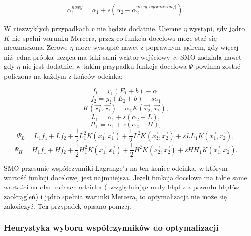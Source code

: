 \documentclass[[10pt,a4paper]{article}
\begin{document}
\begin{equation}
\alpha_1^{nowy} = \alpha_1 + s(\alpha_2 - \alpha_2^{nowy, ograniczony)}).
\end{equation}

W niezwykłych przypadkach $\eta$ nie będzie dodatnie. Ujemne $\eta$ wystąpi, gdy jądro $K$ nie spełni warunku Mercera, przez co funkcja docelowa może stać się nieoznaczona. Zerowe $\eta$ może wystąpić nawet z poprawnym jądrem, gdy więcej niż jedna próbka ucząca ma taki sami wektor wejściowy $x$. SMO zadziała nawet gdy $\eta$ nie jest dodatnie, w takim przypadku funkcja docelowa $\Psi$ powinna zostać policzona na każdym z końców odcinka:


\begin{equation}
f_1 = y_1(E_1+b) - \alpha_1 
\end{equation}
\begin{equation}
f_2 = y_2(E_2+b) - s\alpha_1
\end{equation}
\begin{equation}
K(\overrightarrow{x_1}, \overrightarrow{x_2}) - \alpha_2 K(\overrightarrow{x_2},\overrightarrow{x_2}),
\end{equation}
\begin{equation}
L_1 = \alpha_1 + s(\alpha_2 - L),
\end{equation}
\begin{equation}
H_1 = \alpha_1 + s(\alpha_2 - H),
\end{equation}
\begin{equation}
\Psi_L = L_1 f_1 + Lf_2 + \frac{1}{2}L_1^2 K(\overrightarrow{x_1},\overrightarrow{x_1}) + \frac{1}{2}L^2 K(\overrightarrow{x_2},\overrightarrow{x_2}) + sLL_1 K(\overrightarrow{x_1},\overrightarrow{x_2}), 
\end{equation}
\begin{equation}
\Psi_H = H_1 f_1 + Hf_2 + \frac{1}{2}H_1^2 K(\overrightarrow{x_1},\overrightarrow{x_1}) + \frac{1}{2}H^2 K(\overrightarrow{x_2},\overrightarrow{x_2}) + sHH_1 K(\overrightarrow{x_1},\overrightarrow{x_2}).
\end{equation}


SMO przesunie współczynniki Lagrange'a na ten koniec odcinka, w którym wartość funkcji docelowej jest najmniejsza. Jeżeli funkcja docelowa ma takie same wartości na obu końcach odcinka (uwzględniając mały błąd $\epsilon$ z powodu błędów zaokrągleń) i jądro spełnia warunki Mercera, to optymalizacja nie może się zakończyć. Ten przypadek opisano poniżej.

\subsubsection{Heurystyka wyboru współczynników do optymalizacji}
\end{document}
